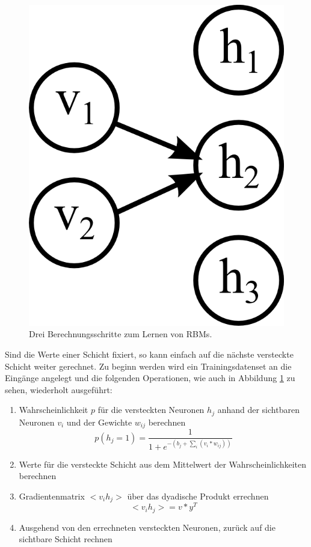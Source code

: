 \begin{figure}
{\begin{minipage}{0.33\textwidth}
	\includegraphics[scale=1]{images/rbm-step3.png}\end{minipage}}
\label{fig:rbm-steps}
\caption{Drei Berechnungsschritte zum Lernen von RBMs.}
\label{fig:rbm-steps}
\end{figure}

Sind die Werte einer Schicht fixiert, so kann einfach auf die nächste versteckte Schicht weiter gerechnet. Zu beginn werden wird ein Trainingsdatenset an die Eingänge angelegt und die folgenden Operationen, wie auch in Abbildung \ref{fig:rbm-steps} zu sehen, wiederholt ausgeführt:

\begin{enumerate}
\item Wahrscheinlichkeit $p$ für die versteckten Neuronen $h_j$ anhand der sichtbaren Neuronen $v_i$ und der Gewichte $w_{ij}$ berechnen $$p(h_j=1) = \frac{1}{1+e^{-(b_j+\sum_{i}(v_i*w_{ij}))}}$$
\item Werte für die versteckte Schicht aus dem Mittelwert der Wahrscheinlichkeiten berechnen
\item Gradientenmatrix $<v_ih_j>$ über das dyadische Produkt errechnen $$<v_ih_j> = v*y^T$$
\item Ausgehend von den errechneten versteckten Neuronen, zurück auf die sichtbare Schicht rechnen
\end{enumerate}

